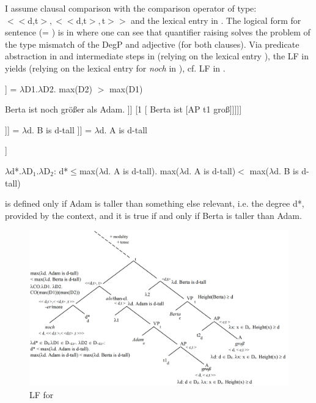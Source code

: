 \documentclass[output=paper
,modfonts
,nonflat]{langsci/langscibook}
\begin{document}
I assume clausal comparison with the comparison operator of type:\\ \mbox{$<<$d,t$>,<<$d,t$>,$t$>>$} \citep[cf.][]{Beck2011} and the lexical entry in . The logical form for sentence  (= ) is in  where one can see that quantifier raising solves the problem of the type mismatch of the DegP and adjective (for both clauses). Via predicate abstraction in  and intermediate steps in (relying on the lexical entry ), the LF in  yields  (relying on the lexical entry for \textit{noch} in ), cf. LF in .

\ea\relax [[-er]] = $\lambda$D1.$\lambda$D2. max(D2) $>$ max(D1) \label{comp-operator}\z

\ea\ea Berta ist noch größer als Adam. \label{B_noch_>_Adam}
\ex\relax [ noch d* [-er than [2[Adam ist [AP t2 groß]]] [1 [ Berta ist [AP t1 groß]]]]] \label{LF_B_noch_>_Adam}
\z\z

\ea\ea \label{PA_on_clauses}\relax [1 [ Berta ist [AP t1 groß]]] = $\lambda$d. B is d-tall
\ex\relax [2 [Adam ist [AP t2 groß]]] =  $\lambda$d. A is d-tall \z\z

\ea\relax [ noch d* [$\lambda$D1.$\lambda$D2. max($\lambda$d. B is d-tall) $>$ max($\lambda$d$'$. A is d$'$-tall) ]] \label{calc_plugin}\z

\ea $\lambda$d*.$\lambda$D$_1$.$\lambda$D$_2$: d*$\leq$max($\lambda$d. A is d-tall). max($\lambda$d. A is d-tall)$<$ max($\lambda$d. B is d-tall)  \label{output_calc}\z

\ea {} is defined only if Adam is taller than something else relevant, i.e. the degree d*, provided by the context, and it is true if and only if Berta is taller than Adam.\z

\begin{figure}
\includegraphics[width=1\textwidth]{figures/LF-mod_comp}
\caption{LF for }
\label{fig:LF_B_noch_>_Adam}
\end{figure}
\end{document}
